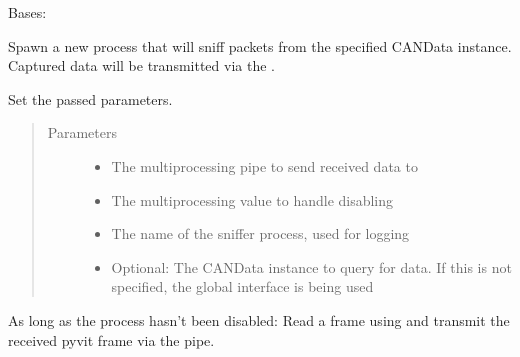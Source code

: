 \documentclass[letterpaper,10pt,english]{sphinxmanual}
\begin{document}
\begin{fulllineitems}
\label{\detokenize{src:src.SnifferProcess.SnifferProcess}}
Bases: 

Spawn a new process that will sniff packets from the specified CANData instance.
Captured data will be transmitted via the .

\begin{fulllineitems}
\label{\detokenize{src:src.SnifferProcess.SnifferProcess.__init__}}
Set the passed parameters.
\begin{quote}\begin{description}
\item[{Parameters}] \leavevmode\begin{itemize}
\item {} 
 \textendash{} The multiprocessing pipe to send received data to

\item {} 
 \textendash{} The multiprocessing value to handle disabling

\item {} 
 \textendash{} The name of the sniffer process, used for logging

\item {} 
 \textendash{} Optional: The CANData instance to query for data.
If this is not specified, the global interface is being used

\end{itemize}

\end{description}\end{quote}

\end{fulllineitems}


\begin{fulllineitems}
\label{\detokenize{src:src.SnifferProcess.SnifferProcess.run}}
As long as the process hasn’t been disabled: Read a frame using {\hyperref[\detokenize{src:src.CANData.CANData.readPacketAsync}]{}}
and transmit the received pyvit frame via the pipe.

\end{fulllineitems}


\end{fulllineitems}
\end{document}
